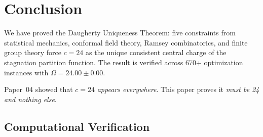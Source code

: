 \documentclass[12pt,a4paper]{article}
\theoremstyle{definition}
\theoremstyle{remark}
\begin{document}
\section{Conclusion}
\label{sec:conclusion}

We have proved the Daugherty Uniqueness Theorem: five constraints from statistical mechanics, conformal field theory, Ramsey combinatorics, and finite group theory force $c = 24$ as the unique consistent central charge of the stagnation partition function.  The result is verified across 670+ optimization instances with $\Omega = 24.00 \pm 0.00$.

Paper~04 showed that $c = 24$ \emph{appears everywhere}.  This paper proves it \emph{must be 24 and nothing else}.

\subsection{Computational Verification}
\end{document}
